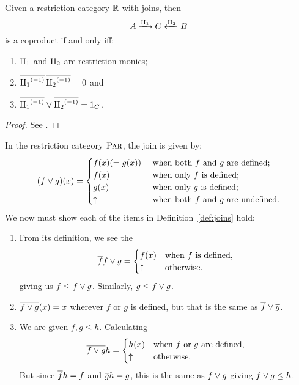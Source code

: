\begin{theorem}\label{lem:join_determines_coproduct}
  Given a restriction category $\mathbb{R}$ with joins, then
  \[
    A \xrightarrow{\amalg_{1}} C \xleftarrow{\amalg_{2}} B
  \]
  is a coproduct if and only iff:
  \begin{enumerate}[{(}i{)}]
    \item $\amalg_{1}$ and $\amalg_{2}$ are restriction monics;
    \item $\overline{{\amalg_{1}}^{(-1)}}\,\overline{{\amalg_{2}}^{(-1)}} = 0$ and
    \item $\overline{{\amalg_{1}}^{(-1)}} \vee \overline{{\amalg_{2}}^{(-1)}} = 1_C$.
  \end{enumerate}
\end{theorem}
\begin{proof}
  See \cite{cockett-guo2007:joinrestrictioncats}.
\end{proof}
\begin{example}\label{ex:joins_in_par}
In the restriction category $\textsc{Par}$, the join is given by:
\[(f \vee g) (x) = \begin{cases}
  f(x)( = g(x))& \text{ when both $f$ and $g$ are defined;}\\
  f(x)& \text{ when only $f$ is defined;}\\
  g(x)& \text{ when only $g$ is defined;}\\
  \uparrow & \text{ when both $f$ and $g$ are undefined.}
\end{cases}
\]
We now must show each of the items in Definition~\ref{def:joins} hold:
  \begin{enumerate}[{(}i{)}]
    \item From its definition, we see the
      \[
        \overline{f}f\vee g = \begin{cases}
          f(x) & \text{when $f$ is defined,}\\
          \uparrow & \text{otherwise.}
          \end{cases}
       \]
       giving us $f \le f\vee g$. Similarly, $g \le f\vee g$.
    \item $\overline{f\vee g}(x) = x$ wherever $f$ or $g$ is defined, but that is the same as $\overline{f}\vee \overline{g}$.
    \item We are given $f,g \le h$. Calculating
      \[
        \overline{f\vee g} h
          = \begin{cases}
            h(x) &\text{when $f$ or $g$ are defined,}\\
            \uparrow &\text{otherwise.}
            \end{cases}
      \]
      But since $\overline{f}h = f$ and $\overline{g}h = g$, this is the same as $f\vee g$ giving $f\vee g \le h$.

\end{enumerate}
\end{example}
